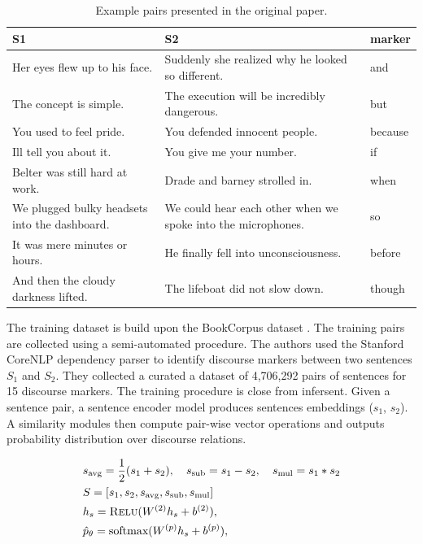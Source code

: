 \begin{table}[!htb]
\centering
\small
\begin{tabularx}{\textwidth}{@{}YYY@{}}
\toprule
S1  & S2  & marker\\
\midrule
\midrule 
Her eyes flew up to his face.
&Suddenly she realized why he looked so different.&
and\\
The concept is simple.
&The execution will be incredibly dangerous.&
but \\
You used to feel pride.
&You defended innocent people.&
because \\
Ill tell you about it.
&You give me your number.&
if \\
Belter was still hard at work.
&Drade and barney strolled in.&
when \\
We plugged bulky headsets into the dashboard.
&We could hear each other when we spoke into the microphones.&
so \\
It was mere minutes or hours.
&He finally fell into unconsciousness.&
before \\
And then the cloudy darkness lifted.
&The lifeboat did not slow down.&
though \\
\bottomrule
\end{tabularx}
\caption{Example pairs presented in the original paper.}
\end{table}

The training dataset is build upon the BookCorpus dataset \parencite{zhu_15}. The training pairs are collected using a semi-automated procedure. The authors used the Stanford CoreNLP dependency parser \parencite{schuster_16} to identify discourse markers between two sentences $S_1$ and $S_2$. They collected a curated a dataset of 4,706,292 pairs of sentences for 15 discourse markers. The training procedure is close from infersent. Given a sentence pair, a sentence encoder model produces sentences embeddings ($s_1$, $s_2$). A similarity modules then compute pair-wise vector operations and outputs probability distribution over discourse relations.

\begin{equation}
\begin{split}
    &s_{\text{avg}} = \frac{1}{2} (s_1 + s_2), ~~~s_{\text{sub}} = s_1 - s_2, ~~~s_{\text{mul}} = s_1 * s_2 \\
    &S = [s_1, s_2, s_{\text{avg}}, s_{\text{sub}}, s_{\text{mul}}]\\
    &h_s = \textsc{Relu}(W^{(2)}h_s + b^{(2)}), \\
    &\hat{p}_{\theta} = \text{softmax}(W^{(p)}h_s + b^{(p)}),\\
\end{split}
\label{eq:vec_op}
\end{equation}

